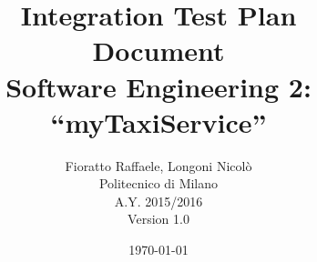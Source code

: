 \begin{figure}
  \centering
	\def\svgwidth{\columnwidth}
    \resizebox{0.66\textwidth}{!}{}
\end{figure}
\title{{\Huge \textbf{I}ntegration \textbf{T}est \textbf{P}lan \\ \textbf{D}ocument}\\{\Large Software Engineering 2: ``myTaxiService''}}

\author{Fioratto Raffaele, Longoni Nicol\`{o}
\\Politecnico di Milano
\\{\small A.Y. 2015/2016}
\\{\small Version 1.0}}
\date{\today}
\maketitle
\newpage
\tableofcontents
